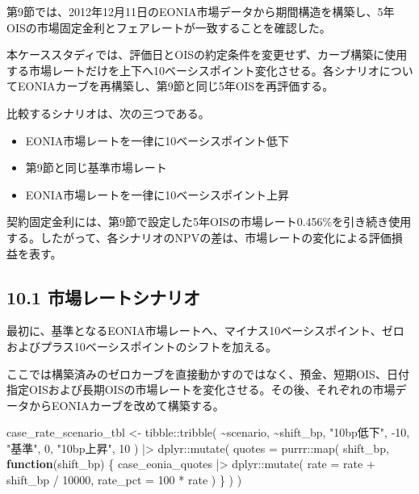 \documentclass[
  letterpaper,
  DIV=11,
  numbers=noendperiod]{scrreprt}
\newenvironment{Shaded}{\begin{snugshade}}{\end{snugshade}}
\newcommand{\AttributeTok}[1]{\textcolor[rgb]{0.40,0.45,0.13}{#1}}
\newcommand{\ControlFlowTok}[1]{\textcolor[rgb]{0.00,0.23,0.31}{\textbf{#1}}}
\newcommand{\DecValTok}[1]{\textcolor[rgb]{0.68,0.00,0.00}{#1}}
\newcommand{\FunctionTok}[1]{\textcolor[rgb]{0.28,0.35,0.67}{#1}}
\newcommand{\NormalTok}[1]{\textcolor[rgb]{0.00,0.23,0.31}{#1}}
\newcommand{\OtherTok}[1]{\textcolor[rgb]{0.00,0.23,0.31}{#1}}
\newcommand{\SpecialCharTok}[1]{\textcolor[rgb]{0.37,0.37,0.37}{#1}}
\newcommand{\StringTok}[1]{\textcolor[rgb]{0.13,0.47,0.30}{#1}}
\providecommand{\tightlist}{%
  \setlength{\itemsep}{0pt}\setlength{\parskip}{0pt}}
\begin{document}
第9節では、2012年12月11日のEONIA市場データから期間構造を構築し、5年OISの市場固定金利とフェアレートが一致することを確認した。

本ケーススタディでは、評価日とOISの約定条件を変更せず、カーブ構築に使用する市場レートだけを上下へ10ベーシスポイント変化させる。各シナリオについてEONIAカーブを再構築し、第9節と同じ5年OISを再評価する。

比較するシナリオは、次の三つである。

\begin{itemize}
\tightlist
\item
  EONIA市場レートを一律に10ベーシスポイント低下
\item
  第9節と同じ基準市場レート
\item
  EONIA市場レートを一律に10ベーシスポイント上昇
\end{itemize}

契約固定金利には、第9節で設定した5年OISの市場レート0.456\%を引き続き使用する。したがって、各シナリオのNPVの差は、市場レートの変化による評価損益を表す。

\subsection{10.1
市場レートシナリオ}\label{ux5e02ux5834ux30ecux30fcux30c8ux30b7ux30caux30eaux30aa}

最初に、基準となるEONIA市場レートへ、マイナス10ベーシスポイント、ゼロおよびプラス10ベーシスポイントのシフトを加える。

ここでは構築済みのゼロカーブを直接動かすのではなく、預金、短期OIS、日付指定OISおよび長期OISの市場レートを変化させる。その後、それぞれの市場データからEONIAカーブを改めて構築する。

\begin{Shaded}
\begin{Highlighting}[]
\NormalTok{case\_rate\_scenario\_tbl }\OtherTok{\textless{}{-}}\NormalTok{ tibble}\SpecialCharTok{::}\FunctionTok{tribble}\NormalTok{(}
  \SpecialCharTok{\textasciitilde{}}\NormalTok{scenario, }\SpecialCharTok{\textasciitilde{}}\NormalTok{shift\_bp,}
  \StringTok{"10bp低下"}\NormalTok{, }\SpecialCharTok{{-}}\DecValTok{10}\NormalTok{,}
  \StringTok{"基準"}\NormalTok{,       }\DecValTok{0}\NormalTok{,}
  \StringTok{"10bp上昇"}\NormalTok{,  }\DecValTok{10}
\NormalTok{) }\SpecialCharTok{|\textgreater{}}
\NormalTok{  dplyr}\SpecialCharTok{::}\FunctionTok{mutate}\NormalTok{(}
    \AttributeTok{quotes =}\NormalTok{ purrr}\SpecialCharTok{::}\FunctionTok{map}\NormalTok{(}
\NormalTok{      shift\_bp,}
      \ControlFlowTok{function}\NormalTok{(shift\_bp) \{}
\NormalTok{        case\_eonia\_quotes }\SpecialCharTok{|\textgreater{}}
\NormalTok{          dplyr}\SpecialCharTok{::}\FunctionTok{mutate}\NormalTok{(}
            \AttributeTok{rate =}\NormalTok{ rate }\SpecialCharTok{+}\NormalTok{ shift\_bp }\SpecialCharTok{/} \DecValTok{10000}\NormalTok{,}
            \AttributeTok{rate\_pct =} \DecValTok{100} \SpecialCharTok{*}\NormalTok{ rate}
\NormalTok{          )}
\NormalTok{      \}}
\NormalTok{    )}
\NormalTok{  )}
\end{Highlighting}
\end{Shaded}
\end{document}
